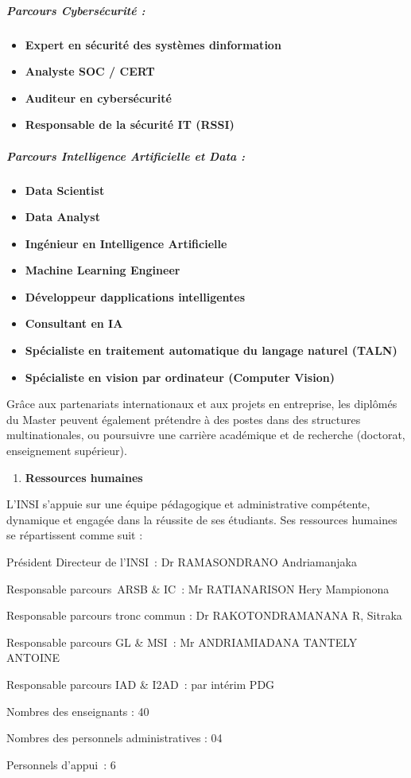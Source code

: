 \hypertarget{parcours-cybersuxe9curituxe9}{%
	\subparagraph{Parcours Cybersécurité
		:}\label{parcours-cybersuxe9curituxe9}}

\begin{itemize}
	\item
	\textbf{Expert en sécurité des systèmes d\textquotesingle information}
	\item
	\textbf{Analyste SOC / CERT}
	\item
	\textbf{Auditeur en cybersécurité}
	\item
	\textbf{Responsable de la sécurité IT (RSSI)}
\end{itemize}

\hypertarget{parcours-intelligence-artificielle-et-data}{%
	\subparagraph{Parcours Intelligence Artificielle et Data
		:}\label{parcours-intelligence-artificielle-et-data}}

\begin{itemize}
	\item
	\textbf{Data Scientist}
	\item
	\textbf{Data Analyst}
	\item
	\textbf{Ingénieur en Intelligence Artificielle}
	\item
	\textbf{Machine Learning Engineer}
	\item
	\textbf{Développeur d\textquotesingle applications intelligentes}
	\item
	\textbf{Consultant en IA}
	\item
	\textbf{Spécialiste en traitement automatique du langage naturel
		(TALN)}
	\item
	\textbf{Spécialiste en vision par ordinateur (Computer Vision)}
\end{itemize}

Grâce aux partenariats internationaux et aux projets en
	entreprise, les diplômés du Master peuvent également prétendre à des
postes dans des structures multinationales, ou poursuivre une
carrière académique et de recherche (doctorat, enseignement
supérieur).

\begin{enumerate}
	\def\labelenumi{\arabic{enumi}.}
	\item
	\textbf{Ressources humaines}
\end{enumerate}

L'INSI s'appuie sur une équipe pédagogique et administrative compétente,
dynamique et engagée dans la réussite de ses étudiants. Ses ressources
humaines se répartissent comme suit :

Président Directeur de l'INSI~: Dr RAMASONDRANO Andriamanjaka

Responsable parcours~ARSB \& IC~: Mr RATIANARISON Hery Mampionona

Responsable parcours tronc commun : Dr RAKOTONDRAMANANA R, Sitraka

Responsable parcours GL \& MSI~: Mr ANDRIAMIADANA TANTELY ANTOINE

Responsable parcours IAD \& I2AD~: par intérim PDG

Nombres des enseignants : 40

Nombres des personnels administratives : 04

Personnels d'appui~: 6

